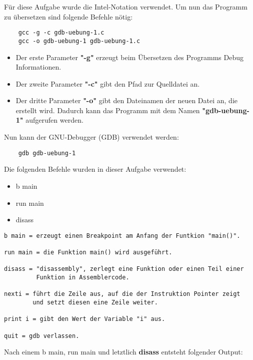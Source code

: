 \documentclass[12pt]{article}
\begin{document}
Für diese Aufgabe wurde die Intel-Notation verwendet. Um nun das Programm zu übersetzen sind folgende Befehle nötig:\\

\begin{lstlisting}
    gcc -g -c gdb-uebung-1.c
    gcc -o gdb-uebung-1 gdb-uebung-1.c
\end{lstlisting}

\begin{itemize}
  \item Der erste Parameter \textbf{"-g"} erzeugt beim Übersetzen des Programms Debug Informationen.
  \item Der zweite Parameter \textbf{"-c"} gibt den Pfad zur Quelldatei an.
  \item Der dritte Parameter \textbf{"-o"} gibt den Dateinamen der neuen Datei an, die erstellt wird. Dadurch kann das Programm mit dem Namen \textbf{"gdb-uebung-1"} aufgerufen werden.
\end{itemize}

Nun kann der GNU-Debugger (GDB) verwendet werden:\\

\begin{lstlisting}
    gdb gdb-uebung-1
\end{lstlisting}

Die folgenden Befehle wurden in dieser Aufgabe verwendet:

\begin{itemize}
    \item b main
    \item run main
    \item disass
\end{itemize}

\begin{lstlisting}
b main = erzeugt einen Breakpoint am Anfang der Funtkion "main()".

run main = die Funktion main() wird ausgeführt.

disass = "disassembly", zerlegt eine Funktion oder einen Teil einer
         Funktion in Assemblercode.
    
nexti = führt die Zeile aus, auf die der Instruktion Pointer zeigt
        und setzt diesen eine Zeile weiter.
            
print i = gibt den Wert der Variable "i" aus.
    
quit = gdb verlassen.
\end{lstlisting}

\newpage
Nach einem b main, run main und letztlich \textbf{disass} entsteht folgender Output:
\end{document}
